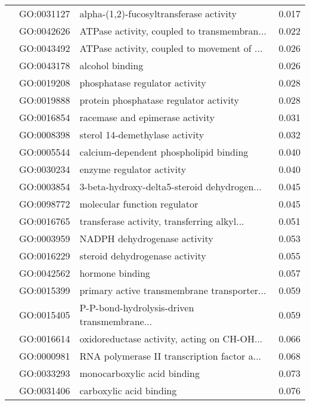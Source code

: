 \begin{longtable}{lllr}
   & GO:0031127 &      alpha-(1,2)-fucosyltransferase activity &         0.017 \\
   & GO:0042626 &  ATPase activity, coupled to transmembran... &         0.022 \\
   & GO:0043492 &  ATPase activity, coupled to movement of ... &         0.026 \\
   & GO:0043178 &                              alcohol binding &         0.026 \\
   & GO:0019208 &               phosphatase regulator activity &         0.028 \\
   & GO:0019888 &       protein phosphatase regulator activity &         0.028 \\
   & GO:0016854 &              racemase and epimerase activity &         0.031 \\
   & GO:0008398 &               sterol 14-demethylase activity &         0.032 \\
   & GO:0005544 &       calcium-dependent phospholipid binding &         0.040 \\
   & GO:0030234 &                    enzyme regulator activity &         0.040 \\
   & GO:0003854 &  3-beta-hydroxy-delta5-steroid dehydrogen... &         0.045 \\
   & GO:0098772 &                 molecular function regulator &         0.045 \\
   & GO:0016765 &  transferase activity, transferring alkyl... &         0.051 \\
   & GO:0003959 &                 NADPH dehydrogenase activity &         0.053 \\
   & GO:0016229 &               steroid dehydrogenase activity &         0.055 \\
   & GO:0042562 &                              hormone binding &         0.057 \\
   & GO:0015399 &  primary active transmembrane transporter... &         0.059 \\
   & GO:0015405 &  P-P-bond-hydrolysis-driven transmembrane... &         0.059 \\
   & GO:0016614 &  oxidoreductase activity, acting on CH-OH... &         0.066 \\
   & GO:0000981 &  RNA polymerase II transcription factor a... &         0.068 \\
   & GO:0033293 &                  monocarboxylic acid binding &         0.073 \\
   & GO:0031406 &                      carboxylic acid binding &         0.076 \\

\end{longtable}
